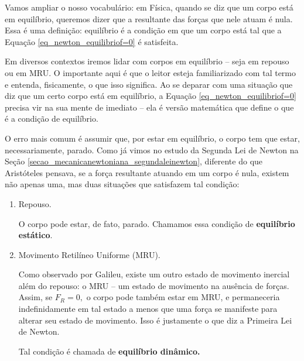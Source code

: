 
Vamos ampliar o nosso vocabulário: em Física, quando se diz que um corpo está em equilíbrio, queremos dizer que a resultante das forças que nele atuam é nula. Essa é uma definição: equilíbrio é a condição em que um corpo está tal que a Equação \eqref{eq_newton_equilibriof=0} é satisfeita.




Em diversos contextos iremos lidar com corpos em equilíbrio -- seja em repouso ou em MRU. O importante aqui é que o leitor esteja familiarizado com tal termo e entenda, fisicamente, o que isso significa. Ao se deparar com uma situação que diz que um certo corpo está em equilíbrio, a Equação \eqref{eq_newton_equilibriof=0} precisa vir na sua mente de imediato -- ela é versão matemática que define o que é a condição de equilíbrio.




O erro mais comum é assumir que, por estar em equilíbrio, o corpo tem que estar, necessariamente, parado. Como já vimos no estudo da Segunda Lei de Newton na Seção \ref{secao_mecanicanewtoniana_segundaleinewton}, diferente do que Aristóteles pensava, se a força resultante atuando em um corpo é nula, existem não apenas uma, mas duas situações que satisfazem tal condição:

\begin{enumerate}
    \item [(i)] Repouso.

     O corpo pode estar, de fato, parado. Chamamos essa condição de \textbf{equilíbrio estático}.

    \item [(ii)] Movimento Retilíneo Uniforme (MRU).

    Como observado por Galileu, existe um outro estado de movimento inercial além do repouso: o MRU -- um estado de movimento na ausência de forças. Assim, se $F_R=0,$ o corpo pode também estar em MRU, e permaneceria indefinidamente em tal estado a menos que uma força se manifeste para alterar seu estado de movimento. Isso é justamente o que diz a Primeira Lei de Newton.

    Tal condição é chamada de \textbf{equilíbrio dinâmico.}
\end{enumerate}




